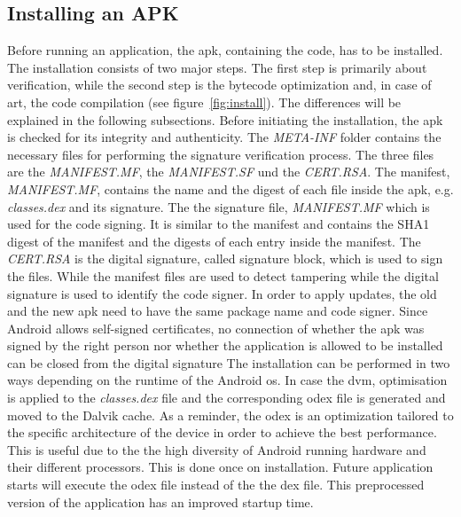 \subsection{Installing an APK} \label{subsection:android-install}
Before running an application, the \gls{apk}, containing the code, has to be installed.
The installation consists of two major steps.
The first step is primarily about verification, while the second step is the bytecode optimization and, in case of \gls{art}, the code compilation (see figure~\ref{fig:install}).
The differences will be explained in the following subsections.
\newline
Before initiating the installation, the \gls{apk} is checked for its integrity and authenticity.
The \textit{META-INF} folder contains the necessary files for performing the signature verification process.
The three files are the \textit{MANIFEST.MF}, the \textit{MANIFEST.SF} und the \textit{CERT.RSA}.
The manifest, \textit{MANIFEST.MF}, contains the name and the digest of each file inside the \gls{apk}, e.g. \textit{classes.dex} and its signature.
The the signature file, \textit{MANIFEST.MF} which is used for the code signing.
It is similar to the manifest and contains the SHA1 digest of the manifest and the digests of each entry inside the manifest.
The \textit{CERT.RSA} is the digital signature, called signature block, which is used to sign the files.
While the manifest files are used to detect tampering while the digital signature is used to identify the code signer.
In order to apply updates, the old and the new \gls{apk} need to have the same package name and code signer.
Since Android allows self-signed certificates, no connection of whether the \gls{apk} was signed by the right person nor whether the application is allowed to be installed can be closed from the digital signature
\cite{codeSigning} \cite{androidSigning}
\newline
The installation can be performed in two ways depending on the runtime of the Android \gls{os}.
In case the \gls{dvm}, optimisation is applied to the \textit{classes.dex} file and the corresponding \gls{odex} file is generated and moved to the Dalvik cache.
As a reminder, the \gls{odex} is an optimization tailored to the specific architecture of the device in order to achieve the best performance.
This is useful due to the the high diversity of Android running hardware and their different processors.
This is done once on installation.
Future application starts will execute the \gls{odex} file instead of the the \gls{dex} file.
This preprocessed version of the application has an improved startup time. \cite{kovachevaMaster}

